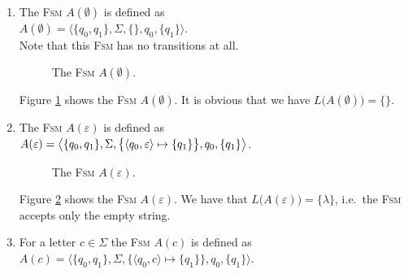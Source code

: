 \begin{enumerate}
\item The \textsc{Fsm} $A(\emptyset)$ is defined as
      \\[0.2cm]
      \hspace*{1.3cm}
      $A(\emptyset) = \bigl\langle \{ q_0, q_1 \}, \Sigma, \{\}, q_0, \{ q_1 \} \bigr\rangle$.
      \\[0.2cm]
      Note that this \textsc{Fsm} has no transitions at all.

      \begin{figure}[!ht]
        \centering
      \caption{The \textsc{Fsm} $A(\emptyset)$.}
      \label{fig:aLeer.eps}
      \end{figure}
      Figure \ref{fig:aLeer.eps} shows the \textsc{Fsm} $A(\emptyset)$. It is obvious that we have
      $L\bigl(A(\emptyset)\bigr) = \{\}$. 
\item The \textsc{Fsm} $A(\varepsilon)$ is defined as
      \\[0.2cm]
      \hspace*{1.3cm}
      $A(\varepsilon) = \bigl\langle \{ q_0, q_1 \}, \Sigma, 
                          \bigl\{ \pair(q_0, \varepsilon) \mapsto \{q_1\} \bigr\}, q_0, \{ q_1 \} \bigr\rangle$.


      \begin{figure}[!ht]
        \centering
      \caption{The \textsc{Fsm} $A(\varepsilon)$.}
      \label{fig:aEpsilon.eps}
      \end{figure}
      Figure \ref{fig:aEpsilon.eps} shows the \textsc{Fsm} $A(\varepsilon)$.
      We have that $L\bigl(A(\varepsilon)\bigr) = \{\lambda\}$, i.e.~the \textsc{Fsm} accepts only the empty string. 
\item For a letter $c \in \Sigma$ the \textsc{Fsm} $A(c)$ is defined as 
      \\[0.2cm]
      \hspace*{1.3cm}
      $A(c) = \bigl\langle \{ q_0, q_1 \}, \Sigma, 
                                \bigl\{ \langle q_0, c \rangle \mapsto \{q_1\}\bigr\}, q_0, \{ q_1 \} \bigr\rangle$.


\end{enumerate}
